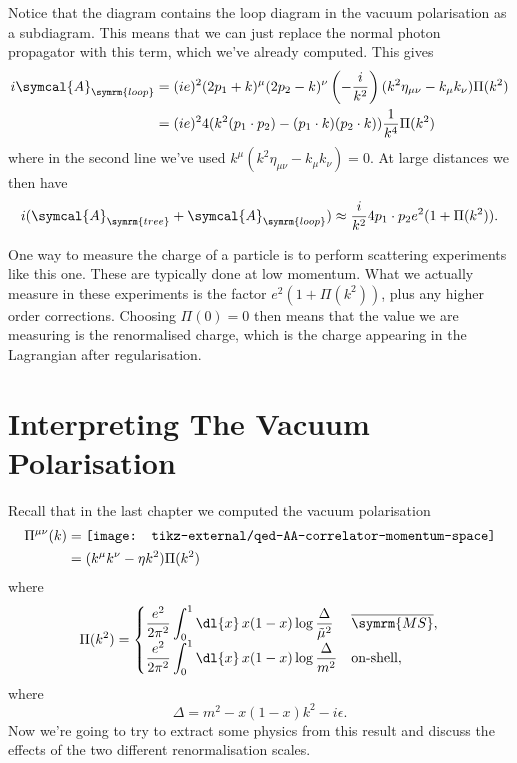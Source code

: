 \documentclass[fleqn]{NotesClass}
\newcommand{\MSbar}{\ensuremath{\overline{\symrm{MS}}}}
\newcommand{\amplitude}{\symcal{A}}
\newcommand{\minkowskiMetric}{\eta}
\begin{document}
    Notice that the diagram contains the loop diagram in the vacuum polarisation as a subdiagram.
    This means that we can just replace the normal photon propagator with this term, which we've already computed.
    This gives
    \begin{align}
        i\amplitude_{\symrm{loop}} &= (ie)^2(2p_1 + k)^\mu(2p_2 - k)^\nu \left( -\frac{i}{k^2} \right)(k^2\minkowskiMetric_{\mu\nu} - k_\mu k_\nu)\Pi(k^2)\\
        &= (ie)^24(k^2 (p_1 \cdot p_2) - (p_1 \cdot k)(p_2 \cdot k)) \frac{1}{k^4}\Pi(k^2)
    \end{align}
    where in the second line we've used \(k^\mu(k^2\minkowskiMetric_{\mu\nu} - k_\mu k_\nu) = 0\).
    At large distances we then have
    \begin{equation}
        \label{eqn:vacuum-polarisation-2-to-2-scattering}
        i(\amplitude_{\symrm{tree}} + \amplitude_{\symrm{loop}}) \approx \frac{i}{k^2}4 p_1 \cdot p_2 e^2 (1 + \Pi(k^2)).
    \end{equation}
    
    One way to measure the charge of a particle is to perform scattering experiments like this one.
    These are typically done at low momentum.
    What we actually measure in these experiments is the factor \(e^2(1 + \Pi(k^2))\), plus any higher order corrections.
    Choosing \(\Pi(0) = 0\) then means that the value we are measuring is the renormalised charge, which is the charge appearing in the Lagrangian after regularisation.
    
    \chapter{Interpreting The Vacuum Polarisation}
    Recall that in the last chapter we computed the vacuum polarisation
    \begin{align}
        \Pi^{\mu\nu}(k) &= \vcenter{\hbox{\texttt{[image: tikz-external/qed-AA-correlator-momentum-space]}}}\\
        &= (k^\mu k^\nu - \minkowskiMetric k^2)\Pi(k^2)
    \end{align}
    where
    \begin{equation}
        \Pi(k^2) =
        \begin{cases}
            \displaystyle \frac{e^2}{2\pi^2} \int_0^1 \dl{x} \, x(1 - x) \log \frac{\Delta}{\tilde{\mu}^2} & \MSbar,\\
            \displaystyle \frac{e^2}{2\pi^2} \int_0^1 \dl{x} \, x(1 - x) \log \frac{\Delta}{m^2} & \text{on-shell},
        \end{cases}
    \end{equation}
    where
    \begin{equation}
        \Delta = m^2 - x(1 - x)k^2 - i\epsilon.
    \end{equation}
    Now we're going to try to extract some physics from this result and discuss the effects of the two different renormalisation scales.
    
\end{document}
